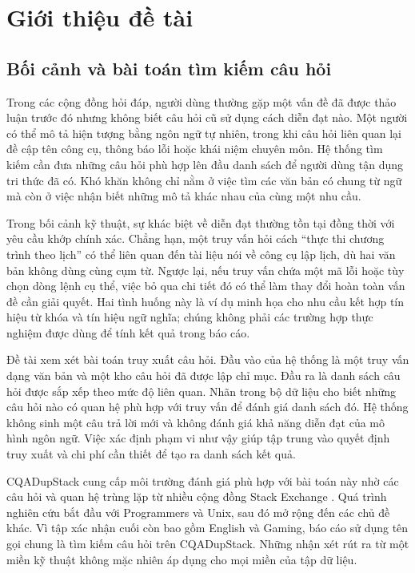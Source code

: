\chapter{Giới thiệu đề tài}
\label{chap:intro}

\section{Bối cảnh và bài toán tìm kiếm câu hỏi}
Trong các cộng đồng hỏi đáp, người dùng thường gặp một vấn đề đã được thảo luận trước đó nhưng không biết câu hỏi cũ sử dụng cách diễn đạt nào. Một người có thể mô tả hiện tượng bằng ngôn ngữ tự nhiên, trong khi câu hỏi liên quan lại đề cập tên công cụ, thông báo lỗi hoặc khái niệm chuyên môn. Hệ thống tìm kiếm cần đưa những câu hỏi phù hợp lên đầu danh sách để người dùng tận dụng tri thức đã có. Khó khăn không chỉ nằm ở việc tìm các văn bản có chung từ ngữ mà còn ở việc nhận biết những mô tả khác nhau của cùng một nhu cầu.

Trong bối cảnh kỹ thuật, sự khác biệt về diễn đạt thường tồn tại đồng thời với yêu cầu khớp chính xác. Chẳng hạn, một truy vấn hỏi cách ``thực thi chương trình theo lịch'' có thể liên quan đến tài liệu nói về công cụ lập lịch, dù hai văn bản không dùng cùng cụm từ. Ngược lại, nếu truy vấn chứa một mã lỗi hoặc tùy chọn dòng lệnh cụ thể, việc bỏ qua chi tiết đó có thể làm thay đổi hoàn toàn vấn đề cần giải quyết. Hai tình huống này là ví dụ minh họa cho nhu cầu kết hợp tín hiệu từ khóa và tín hiệu ngữ nghĩa; chúng không phải các trường hợp thực nghiệm được dùng để tính kết quả trong báo cáo.

Đề tài xem xét bài toán truy xuất câu hỏi. Đầu vào của hệ thống là một truy vấn dạng văn bản và một kho câu hỏi đã được lập chỉ mục. Đầu ra là danh sách câu hỏi được sắp xếp theo mức độ liên quan. Nhãn trong bộ dữ liệu cho biết những câu hỏi nào có quan hệ phù hợp với truy vấn để đánh giá danh sách đó. Hệ thống không sinh một câu trả lời mới và không đánh giá khả năng diễn đạt của mô hình ngôn ngữ. Việc xác định phạm vi như vậy giúp tập trung vào quyết định truy xuất và chi phí cần thiết để tạo ra danh sách kết quả.

CQADupStack cung cấp môi trường đánh giá phù hợp với bài toán này nhờ các câu hỏi và quan hệ trùng lặp từ nhiều cộng đồng Stack Exchange \cite{cqadupstack2015}. Quá trình nghiên cứu bắt đầu với Programmers và Unix, sau đó mở rộng đến các chủ đề khác. Vì tập xác nhận cuối còn bao gồm English và Gaming, báo cáo sử dụng tên gọi chung là tìm kiếm câu hỏi trên CQADupStack. Những nhận xét rút ra từ một miền kỹ thuật không mặc nhiên áp dụng cho mọi miền của tập dữ liệu.


